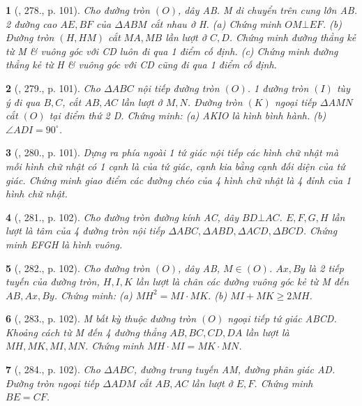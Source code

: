 \documentclass{article}
\newtheorem{baitoan}{}
\begin{document}
\begin{baitoan}[\cite{Binh_Toan_9_tap_2}, 278., p. 101]
	Cho đường tròn $(O)$, dây AB. M di chuyển trên cung lớn AB. 2 đường cao $AE,BF$ của $\Delta ABM$ cắt nhau ở H. (a) Chứng minh $OM\bot EF$. (b) Đường tròn $(H,HM)$ cắt $MA,MB$ lần lượt ở $C,D$. Chứng minh đường thẳng kẻ từ M \& vuông góc với CD luôn đi qua 1 điểm cố định. (c) Chứng minh đường thẳng kẻ từ H \& vuông góc với CD cũng đi qua 1 điểm cố định.
\end{baitoan}

\begin{baitoan}[\cite{Binh_Toan_9_tap_2}, 279., p. 101]
	Cho $\Delta ABC$ nội tiếp đường tròn $(O)$. 1 đường tròn $(I)$ tùy ý đi qua $B,C$, cắt $AB,AC$ lần lượt ở $M,N$. Đường tròn $(K)$ ngoại tiếp $\Delta AMN$ cắt $(O)$ tại điểm thứ 2 D. Chứng minh: (a) AKIO là hình bình hành. (b) $\angle{ADI} = 90^\circ$. 
\end{baitoan}

\begin{baitoan}[\cite{Binh_Toan_9_tap_2}, 280., p. 101]
	Dựng ra phía ngoài 1 tứ giác nội tiếp các hình chữ nhật mà mỗi hình chữ nhật có 1 cạnh là của tứ giác, cạnh kia bằng cạnh đối diện của tứ giác. Chứng minh giao điểm các đường chéo của 4 hình chữ nhật là 4 đỉnh của 1 hình chữ nhật.
\end{baitoan}

\begin{baitoan}[\cite{Binh_Toan_9_tap_2}, 281., p. 102]
	Cho đường tròn đường kính AC, dây $BD\bot AC$. $E,F,G,H$ lần lượt là tâm của 4 đường tròn nội tiếp $\Delta ABC,\Delta ABD,\Delta ACD,\Delta BCD$. Chứng minh EFGH là hình vuông.
\end{baitoan}

\begin{baitoan}[\cite{Binh_Toan_9_tap_2}, 282., p. 102]
	Cho đường tròn $(O)$, dây AB, $M\in(O)$. $Ax,By$ là 2 tiếp tuyến của đường tròn, $H,I,K$ lần lượt là chân các đường vuông góc kẻ từ M đến $AB,Ax,By$. Chứng minh: (a) $MH^2 = MI\cdot MK$. (b) $MI + MK\ge2MH$.
\end{baitoan}

\begin{baitoan}[\cite{Binh_Toan_9_tap_2}, 283., p. 102]
	M bất kỳ thuộc đường tròn $(O)$ ngoại tiếp tứ giác ABCD. Khoảng cách từ M đến 4 đường thẳng $AB,BC,CD,DA$ lần lượt là $MH,MK,MI,MN$. Chứng minh $MH\cdot MI = MK\cdot MN$.
\end{baitoan}

\begin{baitoan}[\cite{Binh_Toan_9_tap_2}, 284., p. 102]
	Cho $\Delta ABC$, đường trung tuyến AM, đường phân giác AD. Đường tròn ngoại tiếp $\Delta ADM$ cắt $AB,AC$ lần lượt ở $E,F$. Chứng minh $BE = CF$.
\end{baitoan}
\end{document}
